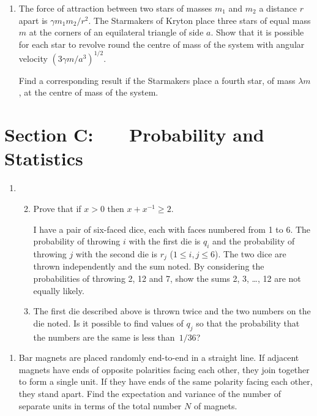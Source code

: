 \documentclass[a4, 11pt]{report}
\newlength{\qspace}
\newcounter{qnumber}
\newenvironment{question}%
 {\vspace{\qspace}
  \begin{enumerate}[\bfseries 1\quad][10]%
    \setcounter{enumi}{\value{qnumber}}%
    \item%
 }
{
  \end{enumerate}
  \filbreak
  \stepcounter{qnumber}
 }
\newenvironment{questionparts}[1][1]%
 {
  \begin{enumerate}[\bfseries (i)]%
    \setcounter{enumii}{#1}
    \addtocounter{enumii}{-1}
    \setlength{\itemsep}{5mm}
    \setlength{\parskip}{8pt}
 }
 {
  \end{enumerate}
 }
\def\le{\leqslant}
\def\ge{\geqslant}
\begin{document}

\begin{question}
The force of attraction between two
stars of masses $m_{1}$ and $m_{2}$ 
a distance $r$ apart is
$\gamma m_{1}m_{2}/r^{2}$. 
The Starmakers of Kryton
place three stars of equal mass $m$ at the
corners of an equilateral triangle of side $a$.
Show that it is possible for each star to revolve
round the centre of mass of the system with angular velocity
$(3\gamma m/a^{3})^{1/2}$.

Find a corresponding result if the Starmakers  place a fourth star,
of mass $\lambda m$, at the centre of mass of the system.
\end{question}
	

	
	\newpage
\section*{Section C: \ \ \ Probability and Statistics}


\begin{question}
\begin{questionparts}
\item Prove that if $x>0$ then $x+x^{-1}\ge2.\;$

I have a pair of six-faced dice, each with faces numbered from 1 to 6.
The probability of throwing $i$ with the first die
is $q_{i}$ and the  
probability of throwing $j$ with the second die
is $r_{j}$ ($1\le i,j \le 6$). The two dice are thrown independently
and the sum noted. By considering the
probabilities of throwing 2, 12 and 7, show
the sums 2, 3, \dots, 12 are not equally likely.

\item
The first die described above is thrown twice
and the two numbers on the die  noted.
Is it possible to find values of $q_{j}$
so that the probability that the numbers are the same
is less than~$1/36$?
\end{questionparts}
\end{question}

\begin{question}
Bar magnets are placed randomly end-to-end in a straight line.
If adjacent magnets have ends of opposite polarities facing each
other, they join together to form a single unit.
If they have ends of the same polarity facing each other, they
stand apart. Find the expectation
and variance of the number of separate units in terms of the total
number $N$ of magnets.
\end{question}
\end{document}
